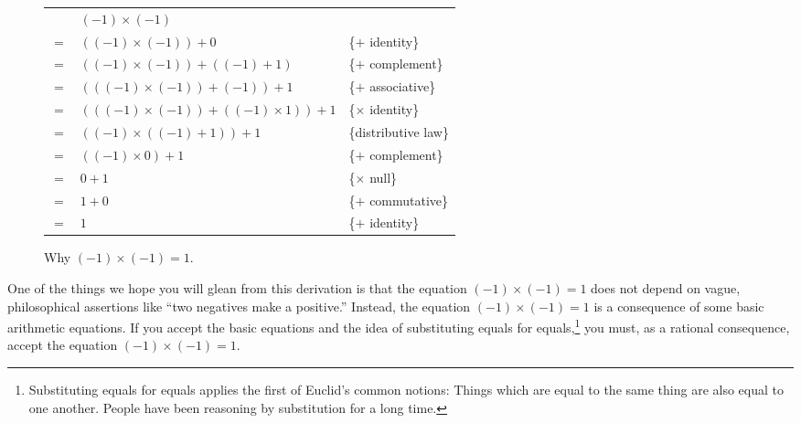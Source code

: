 \begin{figure}
\begin{center}
\begin{spacing}{0.9}
\begin{tabular}{lll}
    & $(-1)\times(-1)$                            & \\
$=$ & $((-1)\times(-1)) + 0$                      & \{$+$ identity\} \\
$=$ & $((-1)\times(-1)) + ((-1) + 1)$             & \{$+$ complement\} \\
$=$ & $(((-1)\times(-1)) + (-1)) + 1$             & \{$+$ associative\} \\
$=$ & $(((-1)\times(-1)) + ((-1) \times 1)) + 1$  & \{$\times$ identity\} \\
$=$ & $((-1)\times((-1) + 1)) + 1$                & \{distributive law\} \\
$=$ & $((-1)\times 0) + 1$                        & \{$+$ complement\} \\
$=$ & $0 + 1$                                     & \{$\times$ null\} \\
$=$ & $1 + 0$                                     & \{$+$ commutative\} \\
$=$ & $1$                                         & \{$+$ identity\} \\
\end{tabular}
\end{spacing}
\end{center}
\caption{Why $(-1)\times(-1)=1$.}
\label{fig-02-02}
\end{figure}

One of the things we hope you will glean from this derivation is that
the equation $(-1)\times(-1) = 1$ does not depend on vague,
philosophical assertions like ``two negatives make a positive.''
Instead, the equation $(-1)\times(-1) = 1$ is a consequence of some
basic arithmetic equations. If you accept the basic equations
and the idea of substituting equals for equals,\footnote{Substituting
equals for equals applies the first of
Euclid's common notions:
Things which are equal to the same thing are also equal to one another.
People have been reasoning by substitution for a long time.}
you must, as a rational consequence, accept the equation
$(-1)\times(-1) = 1$.

